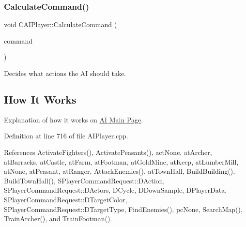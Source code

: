 \hypertarget{classCAIPlayer_ae2742efd250c7d6c00b659ccc29c4be3}{}\label{classCAIPlayer_ae2742efd250c7d6c00b659ccc29c4be3} 
\subsubsection{\texorpdfstring{Calculate\+Command()}{CalculateCommand()}}
{\footnotesize\ttfamily void C\+A\+I\+Player\+::\+Calculate\+Command (\begin{DoxyParamCaption}\item[{\hyperlink{structSPlayerCommandRequest}{S\+Player\+Command\+Request} \&}]{command }\end{DoxyParamCaption})}



Decides what actions the AI should take. 

\hypertarget{classCAIPlayer_cchow_sec}{}\subsection{How It Works}\label{classCAIPlayer_cchow_sec}
Explanation of how it works on \hyperlink{index}{AI Main Page}. 

Definition at line 716 of file A\+I\+Player.\+cpp.



References Activate\+Fighters(), Activate\+Peasants(), act\+None, at\+Archer, at\+Barracks, at\+Castle, at\+Farm, at\+Footman, at\+Gold\+Mine, at\+Keep, at\+Lumber\+Mill, at\+None, at\+Peasant, at\+Ranger, Attack\+Enemies(), at\+Town\+Hall, Build\+Building(), Build\+Town\+Hall(), S\+Player\+Command\+Request\+::\+D\+Action, S\+Player\+Command\+Request\+::\+D\+Actors, D\+Cycle, D\+Down\+Sample, D\+Player\+Data, S\+Player\+Command\+Request\+::\+D\+Target\+Color, S\+Player\+Command\+Request\+::\+D\+Target\+Type, Find\+Enemies(), pc\+None, Search\+Map(), Train\+Archer(), and Train\+Footman().


